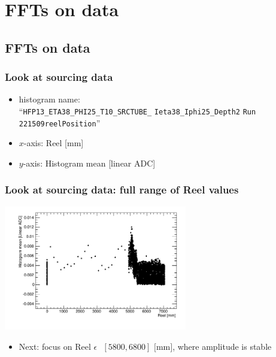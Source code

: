 \documentclass[bigger]{beamer}
\begin{document}
\section{FFTs on data}
\label{sec-3}
\subsection{FFTs on data}
\label{sec-3-1}
\begin{frame}
\frametitle{Look at sourcing data}
\label{sec-3-1-1}
\begin{itemize}

\item histogram name:\\
\label{sec-3-1-1-1}%
``\texttt{HFP13\_ETA38\_PHI25\_T10\_SRCTUBE\_} \newline{}
\texttt{Ieta38\_Iphi25\_Depth2}  \newline{}
\texttt{Run 221509reelPosition}''

\item $x$-axis: Reel [mm]
\label{sec-3-1-1-2}%

\item $y$-axis: Histogram mean [linear ADC]
\label{sec-3-1-1-3}%
\end{itemize} %
\end{frame}
\begin{frame}
\frametitle{Look at sourcing data: full range of Reel values}
\label{sec-3-1-2}
\label{sec-3-1-2-1}

\centering
\includegraphics[width=0.6\textwidth]{fig/sourcing_unzoomed_plot.png}
\begin{itemize}

\item Next: focus on \(\text{Reel } \epsilon \text{ } [5800, 6800] \text{ [mm]}\), where amplitude is stable
\label{sec-3-1-2-2}%
\end{itemize} %
\end{frame}
\end{document}
